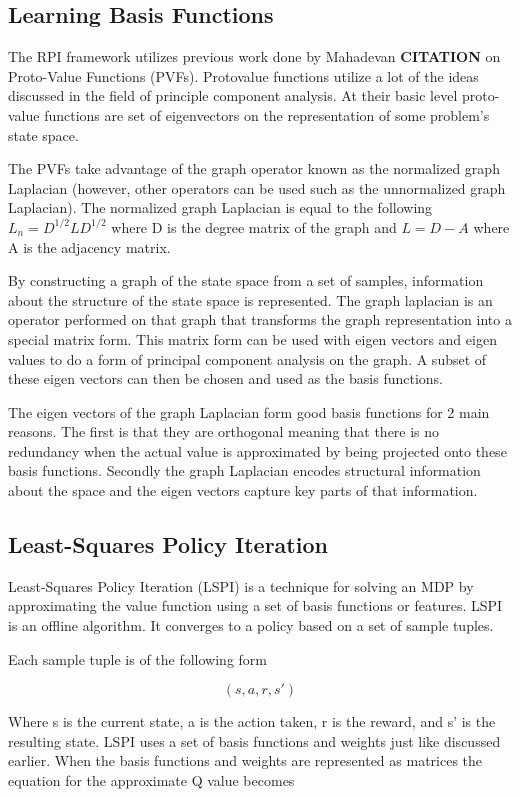 \documentclass[12pt, letterpaper, final]{report}
\begin{document}
\subsection*{Learning Basis Functions}

The RPI framework utilizes previous work done by Mahadevan {\bf
  CITATION} on Proto-Value Functions (PVFs). Protovalue functions utilize a
lot of the ideas discussed in the field of principle component
analysis. At their basic level proto-value functions are set of
eigenvectors on the representation of some problem's state space.

The PVFs take advantage of the graph operator known as the normalized
graph Laplacian (however, other operators can be
used such as the unnormalized graph Laplacian). The normalized graph
Laplacian is equal to the following $L_n = D^{1/2}LD^{1/2}$ where D is
the degree matrix of the graph and $L=D - A$ where A is the adjacency
matrix. 

By constructing a graph of the state space from a set of
samples, information about the structure of the state space is
represented. The graph laplacian is an operator performed on that
graph that transforms the graph representation into a special matrix
form. This matrix form can be used with eigen vectors and eigen values
to do a form of principal component analysis on the graph. A subset of
these eigen vectors can then be chosen and used as the basis functions.

The eigen vectors of the graph Laplacian form good basis functions for
2 main reasons. The first is that they are orthogonal meaning that
there is no redundancy when the actual value is approximated by being
projected onto these basis functions. Secondly the graph Laplacian
encodes structural information about the space and the eigen vectors
capture key parts of that information.

\subsection*{Least-Squares Policy Iteration}

Least-Squares Policy Iteration (LSPI) is a technique for solving an
MDP by approximating the value function using a set of basis functions
or features. LSPI is an offline algorithm. It converges to a policy
based on a set of sample tuples.

Each sample tuple is of the following form

\[
(s, a, r, s')
\]

Where s is the current state, a is the action taken, r is the reward,
and s' is the resulting state. LSPI uses a set of basis functions and
weights just like discussed earlier. When the basis functions and
weights are represented as matrices the equation for the approximate Q
value becomes
\end{document}
